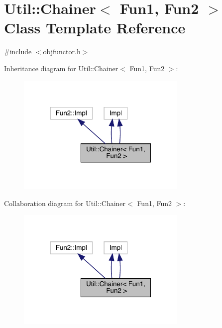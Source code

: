 \hypertarget{classUtil_1_1Chainer}{}\section{Util\+:\+:Chainer$<$ Fun1, Fun2 $>$ Class Template Reference}
\label{classUtil_1_1Chainer}


{\ttfamily \#include $<$objfunctor.\+h$>$}



Inheritance diagram for Util\+:\+:Chainer$<$ Fun1, Fun2 $>$\+:
\nopagebreak
\begin{figure}[H]
\begin{center}
\leavevmode
\includegraphics[width=231pt]{d4/da8/classUtil_1_1Chainer__inherit__graph}
\end{center}
\end{figure}


Collaboration diagram for Util\+:\+:Chainer$<$ Fun1, Fun2 $>$\+:
\nopagebreak
\begin{figure}[H]
\begin{center}
\leavevmode
\includegraphics[width=231pt]{d4/d10/classUtil_1_1Chainer__coll__graph}
\end{center}
\end{figure}
